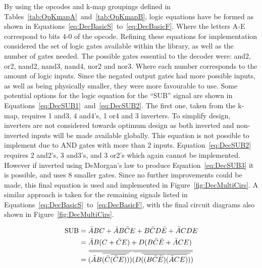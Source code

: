 By using the opcodes and k-map groupings defined in Tables~\ref{tab:OpKmapA}~and~\ref{tab:OpKmapB}, logic equations have be formed as shown in Equations~\ref{eq:DecBasicS}~to~\ref{eq:DecBasicF}. 
Where the letters A-E correspond to bits 4-0 of the opcode. 
Refining these equations for implementation considered the set of logic gates available within the library, as well as the number of gates needed. 
The possible gates essential to the decoder were: and2, or2, nand2, nand3, nand4, nor2 and nor3. Where each number corresponds to the amount of logic inputs. 
Since the negated output gates had more possible inputs, as well as being physically smaller, they were more favourable to use. 
Some potential options for the logic equation for the ``SUB'' signal are shown in Equations~\ref{eq:DecSUB1}~and~\ref{eq:DecSUB2}. 
The first one, taken from the k-map, requires 1 and3, 4 and4's, 1 or4 and 3 inverters. 
To simplify design, inverters are not considered towards optimum design as both inverted and non-inverted inputs will be made available globally. 
This equation is not possible to implement due to AND gates with more than 2 inputs. 
Equation~\ref{eq:DecSUB2} requires 2 and2's, 3 and3's, and 3 or2's which again cannot be implemented. 
However if inverted using DeMorgan's law to produce Equation~\ref{eq:DecSUB3} it is possible, and uses 8 smaller gates. 
Since no further improvements could be made, this final equation is used and implemented in Figure~\ref{fig:DecMultiCirs}. 
A similar approach is taken for the remaining signals listed in Equations~\ref{eq:DecBasicS}~to~\ref{eq:DecBasicF}, with the final circuit diagrams also shown in Figure~\ref{fig:DecMultiCirs}. 

\newcommand{\overbar}[1]{\mkern 1.5mu\overline{\mkern-1.5mu#1\mkern-1.5mu}\mkern 1.5mu}
\begin{align}
	\text{SUB} &= \bar{A}BC + \bar{A}B\bar{C}E + B\bar{C}D\bar{E} + \bar{A}CDE \label{eq:DecSUB1}\\
	&= \bar{A}B(C + \bar{C}E) + D(B\bar{C}\bar{E} + \bar{A}CE) \label{eq:DecSUB2}\\
	&= \overbar{\overbar{(\bar{A}B\overbar{(\bar{C}\overbar{(\bar{C}E)})})}\overbar{(D\overbar{(\overbar{(B\bar{C}\bar{E})}\overbar{(\bar{A}CE)})})}} \label{eq:DecSUB3}
\end{align}

